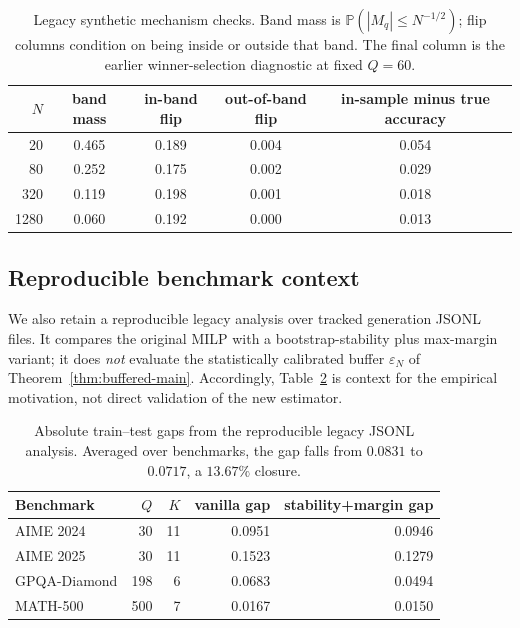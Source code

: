 \begin{table}[t]
\centering
\small
\begin{tabular}{rcccc}
\toprule
\(N\) & band mass & in-band flip & out-of-band flip &
in-sample minus true accuracy \\
\midrule
20   & 0.465 & 0.189 & 0.004 & 0.054 \\
80   & 0.252 & 0.175 & 0.002 & 0.029 \\
320  & 0.119 & 0.198 & 0.001 & 0.018 \\
1280 & 0.060 & 0.192 & 0.000 & 0.013 \\
\bottomrule
\end{tabular}
\caption{Legacy synthetic mechanism checks.  Band mass is
\(\mathbb P(|M_q|\le N^{-1/2})\); flip columns condition on being inside or
outside that band.  The final column is the earlier winner-selection diagnostic
at fixed \(Q=60\).}
\label{tab:legacy-synthetic}
\end{table}

\subsection{Reproducible benchmark context}
\label{app:legacy-real}

We also retain a reproducible legacy analysis over tracked generation JSONL
files.  It compares the original MILP with a bootstrap-stability plus
max-margin variant; it does \emph{not} evaluate the statistically calibrated
buffer \(\varepsilon_N\) of Theorem~\ref{thm:buffered-main}.  Accordingly,
Table~\ref{tab:legacy-real} is context for the empirical motivation, not direct
validation of the new estimator.

\begin{table}[t]
\centering
\small
\begin{tabular}{lrrrr}
\toprule
Benchmark & \(Q\) & \(K\) & vanilla gap & stability+margin gap \\
\midrule
AIME 2024    & 30  & 11 & 0.0951 & 0.0946 \\
AIME 2025    & 30  & 11 & 0.1523 & 0.1279 \\
GPQA-Diamond & 198 & 6  & 0.0683 & 0.0494 \\
MATH-500     & 500 & 7  & 0.0167 & 0.0150 \\
\bottomrule
\end{tabular}
\caption{Absolute train--test gaps from the reproducible legacy JSONL
analysis.  Averaged over benchmarks, the gap falls from \(0.0831\) to
\(0.0717\), a \(13.67\%\) closure.}
\label{tab:legacy-real}
\end{table}

